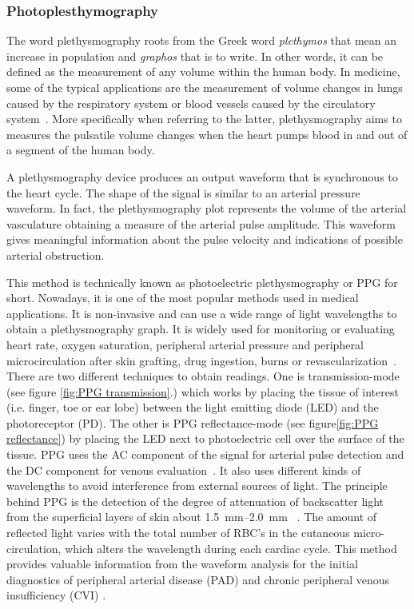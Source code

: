 \subsubsection{Photoplesthymography}
\label{section literature PPG}
The word plethysmography roots from the Greek word \textit{plethymos} that mean an increase in population and \textit{graphos} that is to write. In other words, it can be defined as the measurement of any volume within the human body. In medicine, some of the typical applications are the measurement of volume changes in lungs caused by the respiratory system or blood vessels caused by the circulatory system~\cite{turcott2004methods}. More specifically when referring to the latter, plethysmography aims to measures the pulsatile volume changes when the heart pumps blood in and out of a segment of the human body. 

A plethysmography device produces an output waveform that is synchronous to the heart cycle. The shape of the signal is similar to an arterial pressure waveform. In fact, the plethysmography plot represents the volume of the arterial vasculature obtaining a measure of the arterial pulse amplitude. This waveform gives meaningful information about the pulse velocity and indications of possible arterial obstruction.

This method is technically known as photoelectric plethysmography or PPG for short. Nowadays, it is one of the most popular methods used in medical applications. It is non-invasive and can use a wide range of light wavelengths to obtain a plethysmography graph. It is widely used for monitoring or evaluating heart rate, oxygen saturation, peripheral arterial pressure and peripheral microcirculation after skin grafting, drug ingestion, burns or revascularization~\cite{holohan1996plethysmography}. There are two different techniques to obtain readings. One is transmission-mode (see figure \ref{fig:PPG transmission}.) which works by placing the tissue of interest (i.e. finger, toe or ear lobe) between the light emitting diode (LED) and the photoreceptor (PD). The other is PPG reflectance-mode (see figure\ref{fig:PPG reflectance}) by placing the LED next to photoelectric cell over the surface of the tissue. PPG uses the AC component of the signal for arterial pulse detection and the DC component for venous evaluation~\cite{higgins1986photoplethysmographic}. It also uses different kinds of wavelengths to avoid interference from external sources of light. The principle behind PPG is the detection of the degree of attenuation of backscatter light from the superficial layers of skin about \SIrange{1.5}{2.0}{\milli\meter} ~\cite{holohan1996plethysmography,kim1986pulse,bashkatov2005optical}. The amount of reflected light varies with the total number of RBC’s in the cutaneous micro-circulation, which alters the wavelength during each cardiac cycle. This method provides valuable information from the waveform analysis for the initial diagnostics of peripheral arterial disease (PAD) \cite{allen1993development, williams2005evaluation, alnaeb2007optical} and chronic peripheral venous insufficiency (CVI) \cite{eberhardt2005chronic,norris1983quantitative}.



